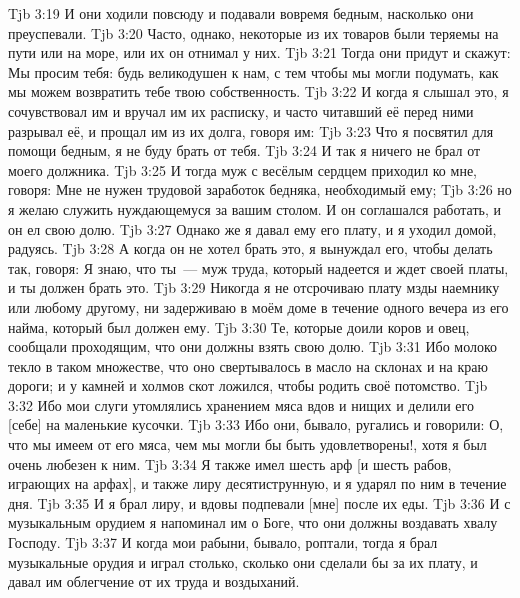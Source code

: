 \vs Tjb 3:19
И они ходили повсюду и подавали вовремя бедным, насколько они преуспевали.
\vs Tjb 3:20
Часто, однако, некоторые из их товаров были теряемы на пути или на море, или их он отнимал у них.
\vs Tjb 3:21
Тогда они придут и скажут: Мы просим тебя: будь великодушен к нам, с тем чтобы мы могли подумать, как мы можем возвратить тебе твою собственность.
\vs Tjb 3:22
И когда я слышал это, я сочувствовал им и вручал им их расписку, и часто читавший её перед ними разрывал её, и прощал им из их долга, говоря им:
\vs Tjb 3:23
Что я посвятил для помощи бедным, я не буду брать от тебя.
\vs Tjb 3:24
И так я ничего не брал от моего должника.
\vs Tjb 3:25
И тогда муж с весёлым сердцем приходил ко мне, говоря: Мне не нужен трудовой заработок бедняка, необходимый ему;
\vs Tjb 3:26
но я желаю служить нуждающемуся за вашим столом. И он соглашался работать, и он ел свою долю.
\vs Tjb 3:27
Однако же я давал ему его плату, и я уходил домой, радуясь.
\vs Tjb 3:28
А когда он не хотел брать это, я вынуждал его, чтобы делать так, говоря: Я знаю, что ты~--- муж труда, который надеется и ждет своей платы, и ты должен брать это.
\vs Tjb 3:29
Никогда я не отсрочиваю плату мзды наемнику или любому другому, ни задерживаю в моём доме в течение одного вечера из его найма, который был должен ему.
\vs Tjb 3:30
Те, которые доили коров и овец, сообщали проходящим, что они должны взять свою долю.
\vs Tjb 3:31
Ибо молоко текло в таком множестве, что оно свертывалось в масло на склонах и на краю дороги; и у камней и холмов скот ложился, чтобы родить своё потомство.
\vs Tjb 3:32
Ибо мои слуги утомлялись хранением мяса вдов и нищих и делили его [себе] на маленькие кусочки.
\vs Tjb 3:33
Ибо они, бывало, ругались и говорили: О, что мы имеем от его мяса, чем мы могли бы быть удовлетворены!, хотя я был очень любезен к ним.
\vs Tjb 3:34
Я также имел шесть арф [и шесть рабов, играющих на арфах], и также лиру десятиструнную, и я ударял по ним в течение дня.
\vs Tjb 3:35
И я брал лиру, и вдовы подпевали [мне] после их еды.
\vs Tjb 3:36
И с музыкальным орудием я напоминал им о Боге, что они должны воздавать хвалу Господу.
\vs Tjb 3:37
И когда мои рабыни, бывало, роптали, тогда я брал музыкальные орудия и играл столько, сколько они сделали бы за их плату, и давал им облегчение от их труда и воздыханий.

